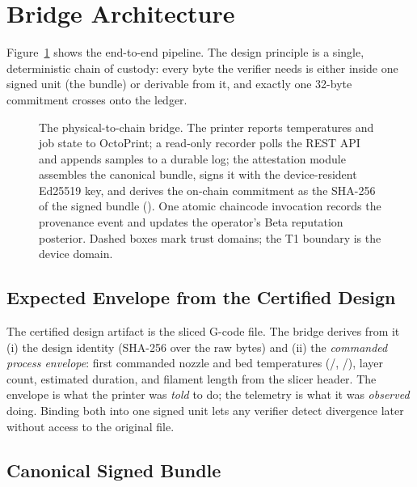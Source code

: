 \section{Bridge Architecture}
\label{sec:architecture}

Figure~\ref{fig:pipeline} shows the end-to-end pipeline.  The design
principle is a single, deterministic chain of custody: every byte the
verifier needs is either inside one signed unit (the bundle) or derivable
from it, and exactly one 32-byte commitment crosses onto the ledger.

\begin{figure}[t]
\centering
\resizebox{0.8\textwidth}{!}{}
\caption{The physical-to-chain bridge.  The printer reports temperatures and
job state to OctoPrint; a read-only recorder polls the REST API and appends
samples to a durable log; the attestation module assembles the canonical
bundle, signs it with the device-resident Ed25519 key, and derives the
on-chain commitment as the SHA-256 of the signed bundle
().  One atomic chaincode invocation records the
provenance event and updates the operator's Beta reputation posterior.
Dashed boxes mark trust domains; the T1 boundary is the device domain.}
\label{fig:pipeline}
\end{figure}

\subsection{Expected Envelope from the Certified Design}
\label{sec:arch_envelope}

The certified design artifact is the sliced G-code file.  The bridge
derives from it (i) the design identity (SHA-256 over the raw bytes) and
(ii) the \emph{commanded process envelope}: first commanded nozzle and bed
temperatures (/, /), layer
count, estimated duration, and filament length from the slicer header.
The envelope is what the printer was \emph{told} to do; the telemetry is
what it was \emph{observed} doing.  Binding both into one signed unit lets
any verifier detect divergence later without access to the original file.

\subsection{Canonical Signed Bundle}
\label{sec:arch_bundle}

